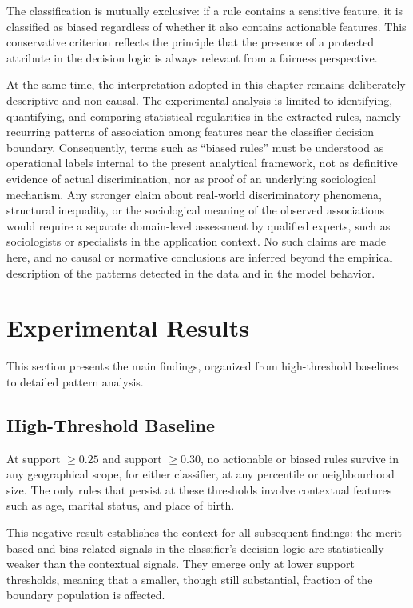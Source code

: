 The classification is mutually exclusive: if a rule contains a sensitive feature, it is classified as biased regardless of whether it also contains actionable features. This conservative criterion reflects the principle that the presence of a protected attribute in the decision logic is always relevant from a fairness perspective.

At the same time, the interpretation adopted in this chapter remains deliberately descriptive and non-causal. The experimental analysis is limited to identifying, quantifying, and comparing statistical regularities in the extracted rules, namely recurring patterns of association among features near the classifier decision boundary. Consequently, terms such as \enquote{biased rules} must be understood as operational labels internal to the present analytical framework, not as definitive evidence of actual discrimination, nor as proof of an underlying sociological mechanism. Any stronger claim about real-world discriminatory phenomena, structural inequality, or the sociological meaning of the observed associations would require a separate domain-level assessment by qualified experts, such as sociologists or specialists in the application context. No such claims are made here, and no causal or normative conclusions are inferred beyond the empirical description of the patterns detected in the data and in the model behavior.

\section{Experimental Results}
\label{sec:main-results}

This section presents the main findings, organized from high-threshold baselines to detailed pattern analysis.

\subsection{High-Threshold Baseline}

At support $\geq 0.25$ and support $\geq 0.30$, no actionable or biased rules survive in any geographical scope, for either classifier, at any percentile or neighbourhood size. The only rules that persist at these thresholds involve contextual features such as age, marital status, and place of birth.

This negative result establishes the context for all subsequent findings: the merit-based and bias-related signals in the classifier's decision logic are statistically weaker than the contextual signals. They emerge only at lower support thresholds, meaning that a smaller, though still substantial, fraction of the boundary population is affected.

